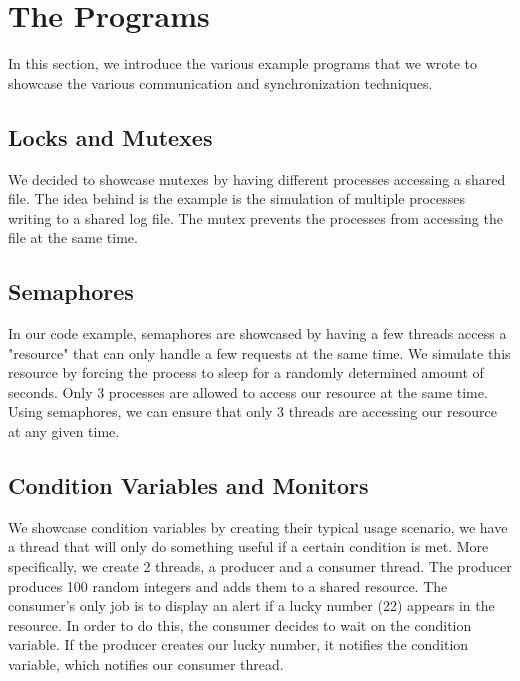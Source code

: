 
\section{The Programs}

In this section, we introduce the various example programs that we wrote to showcase the various communication and synchronization techniques. 

\subsection{Locks and Mutexes}
We decided to showcase mutexes by having different processes accessing a shared file. The idea behind is the example is the simulation of multiple processes writing to a shared log file. The mutex prevents the processes from accessing the file at the same time.


\newpage

\subsection{Semaphores}

In our code example, semaphores are showcased by having a few threads access a "resource" that can only handle a few requests at the same time. We simulate this resource by forcing the process to sleep for a randomly determined amount of seconds. Only 3 processes are allowed to access our resource at the same time. Using semaphores, we can ensure that only 3 threads are accessing our resource at any given time.


\newpage

\subsection{Condition Variables and Monitors}

We showcase condition variables by creating their typical usage scenario, we have a thread that will only do something useful if a certain condition is met. More specifically, we create 2 threads, a producer and a consumer thread. The producer produces 100 random integers and adds them to a shared resource. The consumer's only job is to display an alert if a lucky number (22) appears in the resource. In order to do this, the consumer decides to wait on the condition variable. If the producer creates our lucky number, it notifies the condition variable, which notifies our consumer thread.

